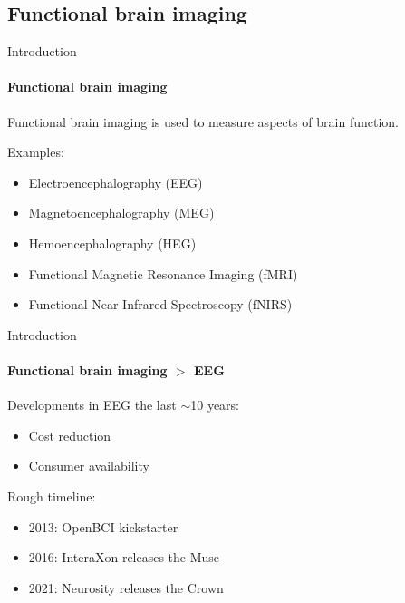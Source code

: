 \documentclass[xcolor={dvipsnames,table},12pt]{beamer}
\begin{document}
\subsection{Functional brain imaging}
\begin{frame}{Introduction}
    \framesubtitle{Functional brain imaging}

    Functional brain imaging is used to measure aspects of brain function.

    Examples:
    \begin{itemize}
        \item Electroencephalography (EEG)
        \item Magnetoencephalography (MEG)
        \item Hemoencephalography (HEG)
        \item Functional Magnetic Resonance Imaging (fMRI)
        \item Functional Near-Infrared Spectroscopy (fNIRS)
    \end{itemize}
\end{frame}

\begin{frame}{Introduction}
    \framesubtitle{Functional brain imaging $>$ EEG}

    Developments in EEG the last $\sim$10 years:

    \begin{itemize}
        \item Cost reduction
        \item Consumer availability
    \end{itemize}

    Rough timeline:

    \begin{itemize}
        \item 2013: OpenBCI kickstarter
        \item 2016: InteraXon releases the Muse
        \item 2021: Neurosity releases the Crown
    \end{itemize}
\end{frame}
\end{document}

